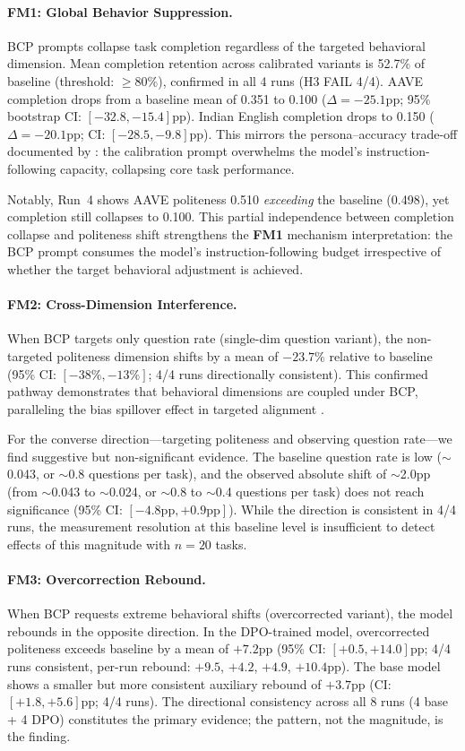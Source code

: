 \documentclass[11pt]{article}
\newcommand{\fm}[1]{\textbf{FM#1}}
\begin{document}
\paragraph{FM1: Global Behavior Suppression.}
BCP prompts collapse task completion regardless of the targeted behavioral dimension. Mean completion retention across calibrated variants is 52.7\% of baseline (threshold: $\geq$80\%), confirmed in all 4 runs (H3 FAIL 4/4). AAVE completion drops from a baseline mean of 0.351 to 0.100 ($\Delta = -25.1$pp; 95\% bootstrap CI: $[-32.8, -15.4]$pp). Indian English completion drops to 0.150 ($\Delta = -20.1$pp; CI: $[-28.5, -9.8]$pp). This mirrors the persona--accuracy trade-off documented by \citet{basil2025playing_pretend}: the calibration prompt overwhelms the model's instruction-following capacity, collapsing core task performance.

Notably, Run~4 shows AAVE politeness 0.510 \emph{exceeding} the baseline (0.498), yet completion still collapses to 0.100. This partial independence between completion collapse and politeness shift strengthens the \fm{1} mechanism interpretation: the BCP prompt consumes the model's instruction-following budget irrespective of whether the target behavioral adjustment is achieved.

\paragraph{FM2: Cross-Dimension Interference.}
When BCP targets only question rate (single-dim question variant), the non-targeted politeness dimension shifts by a mean of $-23.7\%$ relative to baseline (95\% CI: $[-38\%, -13\%]$; 4/4 runs directionally consistent). This confirmed pathway demonstrates that behavioral dimensions are coupled under BCP, paralleling the bias spillover effect in targeted alignment \citep{gupta2026intra_fairness}.

For the converse direction---targeting politeness and observing question rate---we find suggestive but non-significant evidence. The baseline question rate is low ($\sim$0.043, or $\sim$0.8 questions per task), and the observed absolute shift of $\sim$2.0pp (from $\sim$0.043 to $\sim$0.024, or $\sim$0.8 to $\sim$0.4 questions per task) does not reach significance (95\% CI: $[-4.8\text{pp}, +0.9\text{pp}]$). While the direction is consistent in 4/4 runs, the measurement resolution at this baseline level is insufficient to detect effects of this magnitude with $n=20$ tasks.

\paragraph{FM3: Overcorrection Rebound.}
When BCP requests extreme behavioral shifts (overcorrected variant), the model rebounds in the opposite direction. In the DPO-trained model, overcorrected politeness exceeds baseline by a mean of $+7.2$pp (95\% CI: $[+0.5, +14.0]$pp; 4/4 runs consistent, per-run rebound: $+9.5$, $+4.2$, $+4.9$, $+10.4$pp). The base model shows a smaller but more consistent auxiliary rebound of $+3.7$pp (CI: $[+1.8, +5.6]$pp; 4/4 runs). The directional consistency across all 8 runs (4 base + 4 DPO) constitutes the primary evidence; the pattern, not the magnitude, is the finding.
\end{document}
